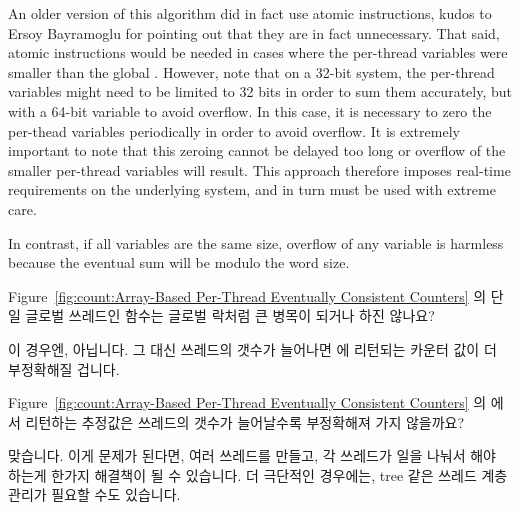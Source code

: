 \begin{enumerate}
	An older version of this algorithm did in fact use atomic
	instructions, kudos to Ersoy Bayramoglu for pointing out that
	they are in fact unnecessary.
	That said, atomic instructions would be needed in cases where
	the per-thread  variables were smaller than the
	global .
	However, note that on a 32-bit system,
	the per-thread  variables
	might need to be limited to 32 bits in order to sum them accurately,
	but with a 64-bit  variable to avoid overflow.
	In this case, it is necessary to zero the per-thead
	 variables periodically in order to avoid overflow.
	It is extremely important to note that this zeroing cannot
	be delayed too long or overflow of the smaller per-thread
	variables will result.
	This approach therefore imposes real-time requirements on the
	underlying system, and in turn must be used with extreme care.

	In contrast, if all variables are the same size, overflow
	of any variable is harmless because the eventual sum
	will be modulo the word size.
	\fi

\QuickQ{}
	Figure~\ref{fig:count:Array-Based Per-Thread Eventually Consistent
	Counters} 의 단일 글로벌 쓰레드인  함수는 글로벌 락처럼
	큰 병목이 되거나 하진 않나요?

\QuickA{}
	이 경우엔, 아닙니다.
	그 대신 쓰레드의 갯수가 늘어나면  에 리턴되는 카운터
	값이 더 부정확해질 겁니다.

\QuickQ{}
	Figure~\ref{fig:count:Array-Based Per-Thread Eventually Consistent
	Counters} 의  에서 리턴하는 추정값은 쓰레드의 갯수가
	늘어날수록 부정확해져 가지 않을까요?

\QuickA{}
	맞습니다.
	이게 문제가 된다면, 여러  쓰레드를 만들고, 각 쓰레드가
	일을 나눠서 해야 하는게 한가지 해결책이 될 수 있습니다.
	더 극단적인 경우에는, tree 같은  쓰레드 계층 관리가
	필요할 수도 있습니다.
	\iffalse


\end{enumerate}
